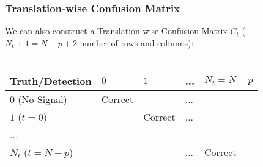 \documentclass[11pt]{article}
\begin{document}
    \subsubsection{Translation-wise Confusion Matrix}
     We can also construct a Translation-wise Confusion Matrix $C_t$ ($N_t+1=N-p+2$ number of rows and columns):
     \\\\
        \begin{tabular}{l|l|l|l|l}
        Truth/Detection&$0$&$1$&...&$N_t=N-p$\\\hline
        $0$ (No Signal)&Correct& &...& \\\hline
        $1$ ($t=0$)& &Correct&...& \\\hline
        ...& & & & \\\hline
        $N_t$ ($t=N-p$)& & &...&Correct\\\hline
        \end{tabular}
        
\end{document}
